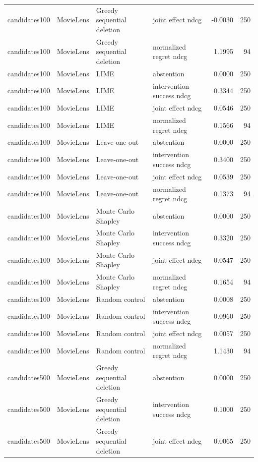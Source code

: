 \begin{longtable}{@{}p{.16\linewidth}p{.11\linewidth}p{.15\linewidth}p{.22\linewidth}rr@{}}
candidates100 & MovieLens & Greedy sequential deletion & joint effect ndcg & -0.0030 & 250 \\
candidates100 & MovieLens & Greedy sequential deletion & normalized regret ndcg & 1.1995 & 94 \\
candidates100 & MovieLens & LIME & abstention & 0.0000 & 250 \\
candidates100 & MovieLens & LIME & intervention success ndcg & 0.3344 & 250 \\
candidates100 & MovieLens & LIME & joint effect ndcg & 0.0546 & 250 \\
candidates100 & MovieLens & LIME & normalized regret ndcg & 0.1566 & 94 \\
candidates100 & MovieLens & Leave-one-out & abstention & 0.0000 & 250 \\
candidates100 & MovieLens & Leave-one-out & intervention success ndcg & 0.3400 & 250 \\
candidates100 & MovieLens & Leave-one-out & joint effect ndcg & 0.0539 & 250 \\
candidates100 & MovieLens & Leave-one-out & normalized regret ndcg & 0.1373 & 94 \\
candidates100 & MovieLens & Monte Carlo Shapley & abstention & 0.0000 & 250 \\
candidates100 & MovieLens & Monte Carlo Shapley & intervention success ndcg & 0.3320 & 250 \\
candidates100 & MovieLens & Monte Carlo Shapley & joint effect ndcg & 0.0547 & 250 \\
candidates100 & MovieLens & Monte Carlo Shapley & normalized regret ndcg & 0.1654 & 94 \\
candidates100 & MovieLens & Random control & abstention & 0.0008 & 250 \\
candidates100 & MovieLens & Random control & intervention success ndcg & 0.0960 & 250 \\
candidates100 & MovieLens & Random control & joint effect ndcg & 0.0057 & 250 \\
candidates100 & MovieLens & Random control & normalized regret ndcg & 1.1430 & 94 \\
candidates500 & MovieLens & Greedy sequential deletion & abstention & 0.0000 & 250 \\
candidates500 & MovieLens & Greedy sequential deletion & intervention success ndcg & 0.1000 & 250 \\
candidates500 & MovieLens & Greedy sequential deletion & joint effect ndcg & 0.0065 & 250 \\

\end{longtable}
